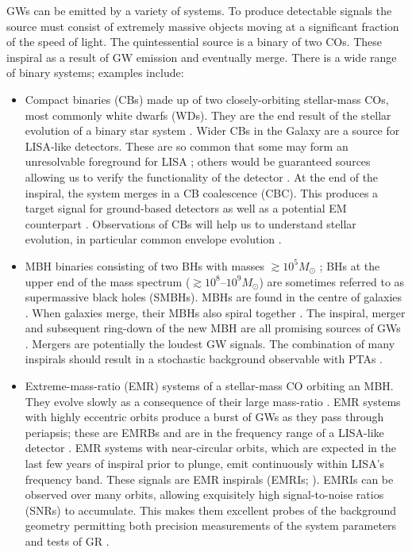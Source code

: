 GWs can be emitted by a variety of systems. To produce detectable signals the source must consist of extremely massive objects moving at a significant fraction of the speed of light. The quintessential source is a binary of two COs. These inspiral as a result of GW emission and eventually merge. There is a wide range of binary systems; examples include:
\begin{itemize}
\item Compact binaries (CBs) made up of two closely-orbiting stellar-mass COs, most commonly white dwarfs (WDs). They are the end result of the stellar evolution of a binary star system \citep{Postnov2006}. Wider CBs in the Galaxy are a source for LISA-like detectors. These are so common that some may form an unresolvable foreground for LISA \citep{Nelemans2009}; others would be guaranteed sources allowing us to verify the functionality of the detector \citep{Stroeer2006}. At the end of the inspiral, the system merges in a CB coalescence (CBC). This produces a target signal for ground-based detectors \citep{Abadie2010a} as well as a potential EM counterpart \citep[e.g.,][]{Webbink1984,Iben1984Jr,Metzger2010,Rezzolla2011,Nakar2011}. Observations of CBs will help us to understand stellar evolution, in particular common envelope evolution \citep{Ivanova2013}.

\item MBH binaries consisting of two BHs with masses $\gtrsim 10^5 M_\odot$ \citep{Sesana2013b}; BHs at the upper end of the mass spectrum ($\gtrsim10^8$--$10^9 M_\odot$) are sometimes referred to as supermassive black holes (SMBHs). MBHs are found in the centre of galaxies \citep{Lynden-Bell1969,Ferrarese2005}. When galaxies merge, their MBHs also spiral together \citep{Volonteri2003,Schnittman2013}. The inspiral, merger and subsequent ring-down of the new MBH are all promising sources of GWs \citep{Flanagan1998}. Mergers are potentially the loudest GW signals. The combination of many inspirals should result in a stochastic background observable with PTAs \citep{Sesana2008}.

\item Extreme-mass-ratio (EMR) systems of a stellar-mass CO orbiting an MBH. They evolve slowly as a consequence of their large mass-ratio \citep{Glampedakis2005,Barack2009}. EMR systems with highly eccentric orbits produce a burst of GWs as they pass through periapsis; these are EMRBs and are in the frequency range of a LISA-like detector \citep{Rubbo2006}. EMR systems with near-circular orbits, which are expected in the last few years of inspiral prior to plunge, emit continuously within LISA's frequency band. These signals are EMR inspirals (EMRIs; \citealt{Amaro-Seoane2007}). EMRIs can be observed over many orbits, allowing exquisitely high signal-to-noise ratios (SNRs) to accumulate. This makes them excellent probes of the background geometry permitting both precision measurements of the system parameters and tests of GR \citep[e.g.,][]{Babak2010}.
\end{itemize}

